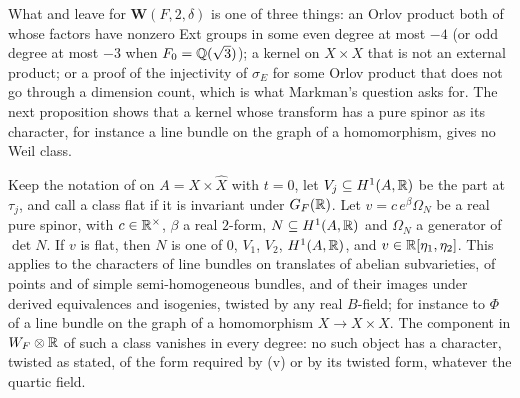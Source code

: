 What  and  leave for
$\mathbf{W}(F,2,\delta)$ is one of three things: an Orlov product both of
whose factors have nonzero Ext groups in some even degree at most $-4$ (or odd
degree at most $-3$ when $F_{0}=\mathbb{Q}(\sqrt3)$); a kernel on $X\times X$ that is
not an external product; or a proof of the injectivity of $\sigma_{E}$ for
some Orlov product that does not go through a dimension count, which is what
Markman's question \cite[Question~11.2.2]{Mar25c} asks for. The next
proposition shows that a kernel whose transform has a pure spinor as its
character, for instance a line bundle on the graph of a homomorphism, gives no
Weil class.

\begin{proposition}
\label{prop:quarticexclusions}
Keep the notation of  on $A=X\times\widehat X$
with $t=0$, let $V_{j}\subseteq H^{1}(A,\mathbb{R})$ be the part at $\tau_{j}$, and
call a class flat if it is invariant under $G_{F}(\mathbb{R})$. Let
$v=c\,e^{\beta}\Omega_{N}$ be a real pure spinor, with $c\in\mathbb{R}^{\times}$,
$\beta$ a real $2$-form, $N\subseteq H^{1}(A,\mathbb{R})$ and $\Omega_{N}$ a
generator of $\det N$. If $v$ is flat, then $N$ is one of $0$, $V_{1}$,
$V_{2}$, $H^{1}(A,\mathbb{R})$, and $v\in\mathbb{R}[\eta_{1},\eta_{2}]$. This applies to
the characters of line bundles on translates of abelian subvarieties, of
points and of simple semi-homogeneous bundles, and of their images under
derived equivalences and isogenies, twisted by any real $B$-field; for
instance to $\Phi$ of a line bundle on the graph of a homomorphism $X\to
X\times X$. The component in $W_{F}\otimes\mathbb{R}$ of such a class vanishes in
every degree: no such object has a character, twisted as stated, of the form
required by (v) or by its twisted form, whatever
the quartic field.
\end{proposition}

